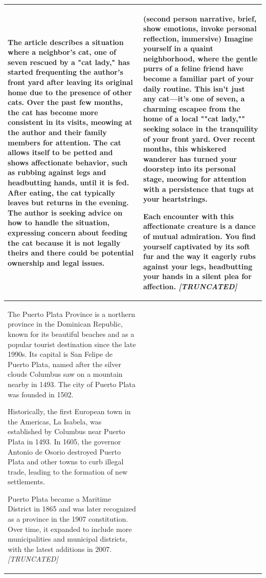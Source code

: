 \begin{table}[h!]
\begin{tabular}{p{} p{}}
\midrule
The article describes a situation where a neighbor's cat, one of seven rescued by a "cat lady," has started frequenting the author's front yard after leaving its original home due to the presence of other cats. Over the past few months, the cat has become more consistent in its visits, meowing at the author and their family members for attention. The cat allows itself to be petted and shows affectionate behavior, such as rubbing against legs and headbutting hands, until it is fed. After eating, the cat typically leaves but returns in the evening. The author is seeking advice on how to handle the situation, expressing concern about feeding the cat because it is not legally theirs and there could be potential ownership and legal issues.
& \textbf{(second person narrative, brief, show emotions, invoke personal reflection, immersive)} \newline
Imagine yourself in a quaint neighborhood, where the gentle purrs of a feline friend have become a familiar part of your daily routine. This isn't just any cat—it's one of seven, a charming escapee from the home of a local ""cat lady,"" seeking solace in the tranquility of your front yard. Over recent months, this whiskered wanderer has turned your doorstep into its personal stage, meowing for attention with a persistence that tugs at your heartstrings.

Each encounter with this affectionate creature is a dance of mutual admiration. You find yourself captivated by its soft fur and the way it eagerly rubs against your legs, headbutting your hands in a silent plea for affection.
\textit{[TRUNCATED]} \\

\midrule

The Puerto Plata Province is a northern province in the Dominican Republic, known for its beautiful beaches and as a popular tourist destination since the late 1990s. Its capital is San Felipe de Puerto Plata, named after the silver clouds Columbus saw on a mountain nearby in 1493. The city of Puerto Plata was founded in 1502.

Historically, the first European town in the Americas, La Isabela, was established by Columbus near Puerto Plata in 1493. In 1605, the governor Antonio de Osorio destroyed Puerto Plata and other towns to curb illegal trade, leading to the formation of new settlements.

Puerto Plata became a Maritime District in 1865 and was later recognized as a province in the 1907 constitution. Over time, it expanded to include more municipalities and municipal districts, with the latest additions in 2007.
\textit{[TRUNCATED]} 





\end{tabular}
\end{table}
